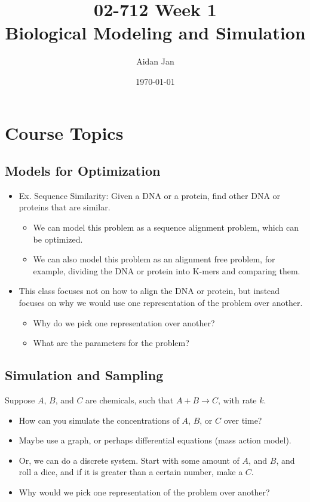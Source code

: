 \documentclass[10pt]{article}
\title{02-712 Week 1 \\ \large{Biological Modeling and Simulation}}
\author{Aidan Jan}
\date{\today}
\begin{document}
\maketitle

\section*{Course Topics}
\subsection*{Models for Optimization}
\begin{itemize}
	\item Ex. Sequence Similarity: Given a DNA or a protein, find other DNA or proteins that are similar.  
	\begin{itemize}
	    \item We can model this problem as a sequence alignment problem, which can be optimized.
	    \item We can also model this problem as an alignment free problem, for example, dividing the DNA or protein into K-mers and comparing them.
    \end{itemize}
	\item This class focuses not on how to align the DNA or protein, but instead focuses on why we would use one representation of the problem over another.
	\begin{itemize}
	    \item Why do we pick one representation over another?
	    \item What are the parameters for the problem?
    \end{itemize}
\end{itemize}

\subsection*{Simulation and Sampling}
Suppose $A$, $B$, and $C$ are chemicals, such that $A + B \rightarrow C$, with rate $k$.
\begin{itemize}
	\item How can you simulate the concentrations of $A$, $B$, or $C$ over time?
	\item Maybe use a graph, or perhaps differential equations (mass action model).
	\item Or, we can do a discrete system.  Start with some amount of $A$, and $B$, and roll a dice, and if it is greater than a certain number, make a $C$.
	\item Why would we pick one representation of the problem over another?
\end{itemize}
\end{document}
